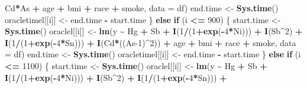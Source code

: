 \documentclass[12pt, twoside]{amherstthesis}
\newenvironment{Shaded}{\begin{snugshade}}{\end{snugshade}}
\newcommand{\AttributeTok}[1]{\textcolor[rgb]{0.13,0.29,0.53}{#1}}
\newcommand{\ControlFlowTok}[1]{\textcolor[rgb]{0.13,0.29,0.53}{\textbf{#1}}}
\newcommand{\DecValTok}[1]{\textcolor[rgb]{0.00,0.00,0.81}{#1}}
\newcommand{\FunctionTok}[1]{\textcolor[rgb]{0.13,0.29,0.53}{\textbf{#1}}}
\newcommand{\NormalTok}[1]{#1}
\newcommand{\OtherTok}[1]{\textcolor[rgb]{0.56,0.35,0.01}{#1}}
\newcommand{\SpecialCharTok}[1]{\textcolor[rgb]{0.81,0.36,0.00}{\textbf{#1}}}
\begin{document}
\begin{Shaded}
\begin{Highlighting}[]
\NormalTok{                           Cd}\SpecialCharTok{*}\NormalTok{As }\SpecialCharTok{+} 
\NormalTok{                           age }\SpecialCharTok{+}\NormalTok{ bmi }\SpecialCharTok{+}\NormalTok{ race }\SpecialCharTok{+}\NormalTok{ smoke, }\AttributeTok{data =}\NormalTok{ df)}
\NormalTok{      end.time }\OtherTok{\textless{}{-}} \FunctionTok{Sys.time}\NormalTok{()}
\NormalTok{      oracletimel[[i]] }\OtherTok{\textless{}{-}}\NormalTok{ end.time }\SpecialCharTok{{-}}\NormalTok{ start.time}
\NormalTok{    \} }\ControlFlowTok{else} \ControlFlowTok{if}\NormalTok{ (i }\SpecialCharTok{\textless{}=} \DecValTok{900}\NormalTok{) \{}
\NormalTok{      start.time }\OtherTok{\textless{}{-}} \FunctionTok{Sys.time}\NormalTok{()}
\NormalTok{      oraclel[[i]] }\OtherTok{\textless{}{-}} \FunctionTok{lm}\NormalTok{(y }\SpecialCharTok{\textasciitilde{}}\NormalTok{ Hg }\SpecialCharTok{+}\NormalTok{ Sb }\SpecialCharTok{+}
                           \FunctionTok{I}\NormalTok{(}\DecValTok{1}\SpecialCharTok{/}\NormalTok{(}\DecValTok{1}\SpecialCharTok{+}\FunctionTok{exp}\NormalTok{(}\SpecialCharTok{{-}}\DecValTok{4}\SpecialCharTok{*}\NormalTok{Ni))) }\SpecialCharTok{+} \FunctionTok{I}\NormalTok{(Sb}\SpecialCharTok{\^{}}\DecValTok{2}\NormalTok{) }\SpecialCharTok{+} \FunctionTok{I}\NormalTok{(}\DecValTok{1}\SpecialCharTok{/}\NormalTok{(}\DecValTok{1}\SpecialCharTok{+}\FunctionTok{exp}\NormalTok{(}\SpecialCharTok{{-}}\DecValTok{4}\SpecialCharTok{*}\NormalTok{Sn))) }\SpecialCharTok{+}
                           \FunctionTok{I}\NormalTok{(Cd}\SpecialCharTok{*}\NormalTok{((As}\DecValTok{{-}1}\NormalTok{)}\SpecialCharTok{\^{}}\DecValTok{2}\NormalTok{)) }\SpecialCharTok{+} 
\NormalTok{                           age }\SpecialCharTok{+}\NormalTok{ bmi }\SpecialCharTok{+}\NormalTok{ race }\SpecialCharTok{+}\NormalTok{ smoke, }\AttributeTok{data =}\NormalTok{ df)}
\NormalTok{      end.time }\OtherTok{\textless{}{-}} \FunctionTok{Sys.time}\NormalTok{()}
\NormalTok{      oracletimel[[i]] }\OtherTok{\textless{}{-}}\NormalTok{ end.time }\SpecialCharTok{{-}}\NormalTok{ start.time}
\NormalTok{    \} }\ControlFlowTok{else} \ControlFlowTok{if}\NormalTok{ (i }\SpecialCharTok{\textless{}=} \DecValTok{1100}\NormalTok{) \{}
\NormalTok{      start.time }\OtherTok{\textless{}{-}} \FunctionTok{Sys.time}\NormalTok{()}
\NormalTok{      oraclel[[i]] }\OtherTok{\textless{}{-}} \FunctionTok{lm}\NormalTok{(y }\SpecialCharTok{\textasciitilde{}}\NormalTok{ Hg }\SpecialCharTok{+}\NormalTok{ Sb }\SpecialCharTok{+}
                           \FunctionTok{I}\NormalTok{(}\DecValTok{1}\SpecialCharTok{/}\NormalTok{(}\DecValTok{1}\SpecialCharTok{+}\FunctionTok{exp}\NormalTok{(}\SpecialCharTok{{-}}\DecValTok{4}\SpecialCharTok{*}\NormalTok{Ni))) }\SpecialCharTok{+} \FunctionTok{I}\NormalTok{(Sb}\SpecialCharTok{\^{}}\DecValTok{2}\NormalTok{) }\SpecialCharTok{+} \FunctionTok{I}\NormalTok{(}\DecValTok{1}\SpecialCharTok{/}\NormalTok{(}\DecValTok{1}\SpecialCharTok{+}\FunctionTok{exp}\NormalTok{(}\SpecialCharTok{{-}}\DecValTok{4}\SpecialCharTok{*}\NormalTok{Sn))) }\SpecialCharTok{+}

\end{Highlighting}
\end{Shaded}
\end{document}
